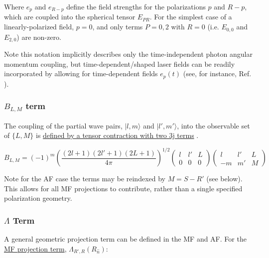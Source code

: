 \documentclass[10pt]{article}
\begin{document}
Where \(e_{p}\) and \(e_{R-p}\) define the field strengths for the
polarizations \(p\) and \(R-p\), which are coupled into the spherical
tensor \(E_{PR}\). For the simplest case of a linearly-polarized field, $p=0$, and only terms $P=0,2$ with $R=0$ (i.e. $E_{0,0}$ and $E_{2,0}$) are non-zero.

Note this notation implicitly describes only the time-independent photon angular momentum coupling,
but time-dependent/shaped laser fields can be readily incorporated by allowing for time-dependent fields $e_{p}(t)$ (see, for instance, Ref. \cite{hockett2015CompletePhotoionizationExperiments}).

\subsubsection{\texorpdfstring{\(B_{L,M}\)
term}{B\_\{L,M\} term}}\label{b_lm-term}

The coupling of the partial wave pairs, \(|l,m\rangle\) and
\(|l',m'\rangle\), into the observable set of \(\{L,M\}\) is
\href{https://epsproc.readthedocs.io/en/latest/methods/geometric_method_dev_260220_090420_tidy.html\#B_\%7BL,M\%7D-term}{defined
by a tensor contraction with two 3j terms} \cite{zareAngMom}.

\begin{equation}
B_{L,M}=(-1)^{m}\left(\frac{(2l+1)(2l'+1)(2L+1)}{4\pi}\right)^{1/2}\left(\begin{array}{ccc}
l & l' & L\\
0 & 0 & 0
\end{array}\right)\left(\begin{array}{ccc}
l & l' & L\\
-m & m' & M
\end{array}\right)
\label{eq:BLM-func-defn}
\end{equation}

Note for the AF case the terms may be reindexed by $M=S-R'$ (see below). This allows for all MF projections to contribute, rather than a single specified polarization geometry.

\subsubsection{\texorpdfstring{\(\Lambda\)
Term}{\textbackslash{}Lambda term}}\label{lambda-term}

A general geometric projection term can be defined in the MF and AF.
For the \href{https://epsproc.readthedocs.io/en/latest/methods/geometric_method_dev_260220_090420_tidy.html\#/Lambda-Term}{MF
projection term}, \(\Lambda_{R',R}(R_{\hat{n}})\):
\end{document}
